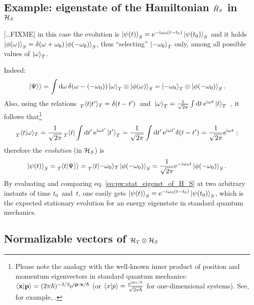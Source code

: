 \subsection{Example: eigenstate of the Hamiltonian $\hat{H}_S$ in $\mathcal{H}_S$}\label{sec:pw:eeigenstate}

[\dots FIXME] in this case the evolution is
$\ket{\psi(t)}_{S} = \mathrm{e}^{-\mathrm{i}\mkern1mu\omega_{0}(t-t_{0})} \ket{\psi(t_0)}_{S}$
and it holds
$\ket{\phi(\omega)}_{S} = \delta(\omega+\omega_0) \ket{\phi(-\omega_0)}_{S}$,
thus  ``selecting'' $\ket{-\omega_0}_T$ only, among all possible values
of $\ket{\omega}_T$.

Indeed:
\[
  \left.\left| \Psi \right\rangle\right\rangle = \int \dd{\omega} \delta(\omega-(-\omega_0))\ket{\omega}_T \otimes \ket{\phi(\omega)}_S =
    \ket{-\omega_0}_T \otimes \ket{\phi(-\omega_0)}_S \text{.}
\]
Also, using the relations
$
\, \prescript{}{T}{\braket{t}{t'}}_T = \delta(t-t') \,
$
and
$
  \,
  \ket{\omega}_T =
  \frac{1}{\sqrt{2\pi}} \int\dd{t}\mathrm{e}^{\mathrm{i}\mkern1mu\omega t}\ket{t}_T
  \,
$
\parencite{Lloyd:Time},
it follows that\footnote{%
  Please note the analogy with the well-known
  inner product of position and momentum eigenvectors in standard quantum mechanics:
  $\braket{\vb{x}}{\vb{p}} = (2\pi\hbar)^{-3/2}\E^{\iu \vb{p} \vdot \vb{x}  / \hbar}$
  (or $\braket{x}{p} = \frac{\mathrm{e}^{\mathrm{i}\mkern1mu p x / \hbar}}{\sqrt{2\pi\hbar}}$ for one-dimensional systems).
  See, for example, \cite[126--127]{Ballentine}.
}
\[
  \prescript{}{T}{\braket{t}{\omega}}_T =
  \frac{1}{\sqrt{2\pi}}\prescript{}{T}{\bra{t}} \int\dd{t'}\mathrm{e}^{\mathrm{i}\mkern1mu\omega t'}\ket{t'}_T  =
  \frac{1}{\sqrt{2\pi}}\int\dd{t'}\mathrm{e}^{\mathrm{i}\mkern1mu\omega t'}\delta(t-t') =
  \frac{1}{\sqrt{2\pi}} \mathrm{e}^{\mathrm{i}\mkern1mu\omega t} \; \text{;}
\]
therefore the \emph{evolution} (in $\mathcal{H}_S$) is
\begin{equation}
  \ket{\psi(t)}_S = \prescript{}{T}{\!\left.\left\langle t \middle| \Psi \right\rangle\right\rangle} = \prescript{}{T}{\braket{t}{-\omega_0}}_{T} \ket{\phi(-\omega_0)}_S =
    \frac{1}{\sqrt{2\pi}} \mathrm{e}^{-\mathrm{i}\mkern1mu\omega_0 t} \ket{\phi(-\omega_0)}_S \text{.}
\label{eq:pw:stat_eigenst_of_H_S}
\end{equation}
By evaluating and comparing eq. \eqref{eq:pw:stat_eigenst_of_H_S} at two arbitrary instants of time
$t_0$~and~$t$,
one easily gets
$\ket{\psi(t)}_{S} = \mathrm{e}^{-\mathrm{i}\mkern1mu\omega_{0}(t-t_{0})} \ket{\psi(t_0)}_{S}$,
which is the expected stationary evolution for an energy eigenstate in standard quantum mechanics. 

{\color{magenta}\hrulefill}

\subsection{Normalizable vectors of $\mathcal{H}_T \otimes \mathcal{H}_S$}
\label{sec:properpw}

